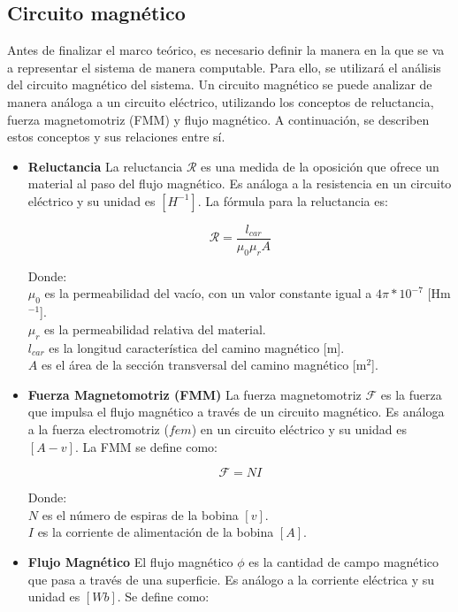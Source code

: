 \newpage
\subsection{Circuito magnético}
Antes de finalizar el marco teórico, es necesario definir la manera en la que se va a representar el sistema de manera computable. Para ello, se utilizará el análisis del circuito magnético del sistema. Un circuito magnético se puede analizar de manera análoga a un circuito eléctrico, utilizando los conceptos de reluctancia, fuerza magnetomotriz (FMM) y flujo magnético. A continuación, se describen estos conceptos y sus relaciones entre sí.

\begin{itemize}
    \item \textbf{Reluctancia}
    La reluctancia \(\mathcal{R}\) es una medida de la oposición que ofrece un material al paso del flujo magnético. Es análoga a la resistencia en un circuito eléctrico y su unidad es \([H^{-1}]\). La fórmula para la reluctancia es:
    
    \[\mathcal{R}=\frac{l_{car}}{\mu_0\mu_r A}\] 
    
    Donde:\\
    \(\mu_0\) es la permeabilidad del vacío, con un valor constante igual a \(4\pi*10^{-7}\) [Hm\(^{-1}\)].\\
    \(\mu_r\) es la permeabilidad relativa del material.\\
    \(l_{car}\) es la longitud característica del camino magnético [m].\\
    \(A\) es el área de la sección transversal del camino magnético [m\(^2\)].\\

    \item \textbf{Fuerza Magnetomotriz (FMM)}
    La fuerza magnetomotriz \(\mathcal{F}\) es la fuerza que impulsa el flujo magnético a través de un circuito magnético. Es análoga a la fuerza electromotriz (\(fem\)) en un circuito eléctrico y su unidad es \([A-v]\). La FMM se define como:
    
    \[\mathcal{F}=NI\]
    
    Donde:\\
    \(N\) es el número de espiras de la bobina \([v]\).\\
    \(I\) es la corriente de alimentación de la bobina \([A]\).\\

    \item \textbf{Flujo Magnético}
    El flujo magnético \(\phi\) es la cantidad de campo magnético que pasa a través de una superficie. Es análogo a la corriente eléctrica y su unidad es \([Wb]\). Se define como:
    

\end{itemize}
